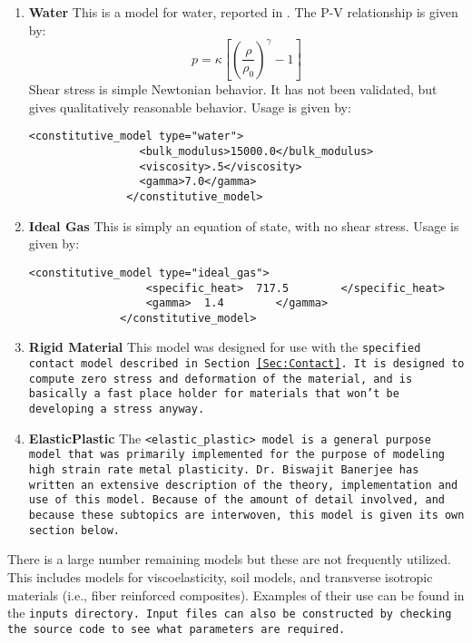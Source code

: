 \begin{enumerate}
\item{\bf Water}  This is a model for water, reported in \cite{water_model_ref}.
The P-V relationship is given by:
\begin{equation}
p=\kappa\left[\left(\frac{\rho}{\rho_0}\right)^{\gamma} - 1\right]
\end{equation}
Shear stress is simple Newtonian behavior.  It has not been validated,
but gives qualitatively reasonable behavior.  Usage is given by:
\begin{Verbatim}[fontsize=\footnotesize]
              <constitutive_model type="water">
                 <bulk_modulus>15000.0</bulk_modulus>
                 <viscosity>.5</viscosity>
                 <gamma>7.0</gamma>
               </constitutive_model>
\end{Verbatim}

\item{\bf Ideal Gas}  This is simply an equation of state, with no shear stress.
Usage is given by:

\begin{Verbatim}[fontsize=\footnotesize]
              <constitutive_model type="ideal_gas">
                  <specific_heat>  717.5        </specific_heat>
                  <gamma>  1.4        </gamma>
              </constitutive_model>
\end{Verbatim}

\item{\bf Rigid Material}  This model was designed for use with the
\tt specified \normalfont contact model described in Section~\ref{Sec:Contact}.
It is designed to compute zero stress and deformation of the material,
and is basically a fast place holder for materials that won't be developing
a stress anyway.

\item{\bf ElasticPlastic} The \tt <elastic\_plastic> \normalfont model is a
general purpose model that was primarily implemented for the purpose of
modeling high strain rate metal plasticity.  Dr. Biswajit Banerjee has
written an extensive description of the theory, implementation and use of
this model.  Because of the amount of detail involved, and because these
subtopics are interwoven, this model is given its own section below.

\end{enumerate}

There is a large number remaining models but these are not frequently utilized. 
This includes models for viscoelasticity, soil models, and transverse isotropic materials (i.e., fiber reinforced composites).
Examples of their use can be found in the \tt inputs \normalfont directory.
Input files can also be constructed by checking the source code to see
what parameters are required.

